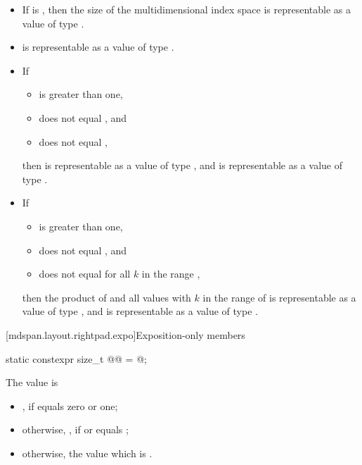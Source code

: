 \pnum
\mandates
\begin{itemize}
\item
If  is ,
then the size of the multidimensional index space 
is representable as a value of type .
\item
{} is representable as a value of type .
\item
If
\begin{itemize}
\item
{} is greater than one,
\item
{} does not equal , and
\item
{} does not equal ,
\end{itemize}
then 
is representable as a value of type , and
is representable as a value of type .
\item
If
\begin{itemize}
\item
{} is greater than one,
\item
{} does not equal , and
\item
{} does not equal 
for all $k$ in the range ,
\end{itemize}
then the product of
 and
all values 
with $k$ in the range of 
is representable as a value of type , and
is representable as a value of type .
\end{itemize}

[mdspan.layout.rightpad.expo]{Exposition-only members}

\begin{itemdecl}
static constexpr size_t @@ = @\seebelow@;
\end{itemdecl}

\begin{itemdescr}
\pnum
The value is
\begin{itemize}
\item
{}, if  equals zero or one;
\item
otherwise, ,
if  or  equals
;
\item
otherwise, the  value which is
.
\end{itemize}
\end{itemdescr}

